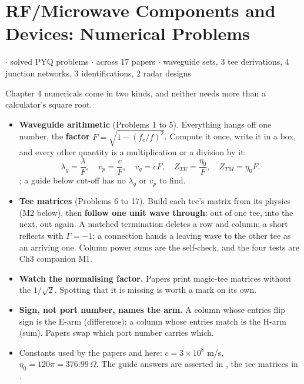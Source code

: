 \section{RF/Microwave Components and Devices: Numerical Problems}
{\color{sub}\footnotesize {} \gap$\cdot$ solved PYQ problems \gap$\cdot$\gap
across 17 papers \gap$\cdot$ waveguide sets, 3 tee derivations, 4 junction networks, 3 identifications, 2 radar designs}

\vspace{3pt}\noindent
\colorbox{gdL}{\makebox[\dimexpr\textwidth-2\fboxsep][l]{%
  \textcolor{gd}{\bfseries\footnotesize READ THIS FIRST}}}
\par\nobreak\vspace{3pt}

Chapter 4 numericals come in two kinds, and neither needs more than a calculator's square root.
\begin{itemize}
  \item \textbf{Waveguide arithmetic} (Problems 1 to 5). Everything hangs off one number,
    the \textbf{factor} $F = \sqrt{1 - (f_c/f)^2}$. Compute it once, write it in a box, and
    every other quantity is a multiplication or a division by it:
    \[ \lambda_g = \frac{\lambda}{F}, \quad v_p = \frac{c}{F}, \quad v_g = cF, \quad
       Z_{TE} = \frac{\eta_0}{F}, \quad Z_{TM} = \eta_0 F. \]
    ; a guide below
    cut-off has no $\lambda_g$ or $v_p$ to find.
  \item \textbf{Tee matrices} (Problems 6 to 17). Build each tee's matrix from its physics
    (M2 below), then \textbf{follow one unit wave through}: out of one tee, into the next,
    out again. A matched termination deletes a row and column; a short reflects with
    $\Gamma = -1$; a connection hands a leaving wave to the other tee as an arriving one.
    Column power sums are the self-check, and the four tests are Ch3 companion M1.
  \item \textbf{Watch the normalising factor.} Papers print magic-tee matrices without the
    $1/\sqrt{2}$. Spotting that it is missing is worth a mark on its own.
  \item \textbf{Sign, not port number, names the arm.} A column whose entries flip sign is
    the E-arm (difference); a column whose entries match is the H-arm (sum). Papers swap
    which port number carries which.
  \item Constants used by the papers and here: $c = 3\times10^8$ m/s,
    $\eta_0 = 120\pi = 376.99\,\Omega$. The guide answers are asserted in ,
    the tee matrices in .
\end{itemize}

